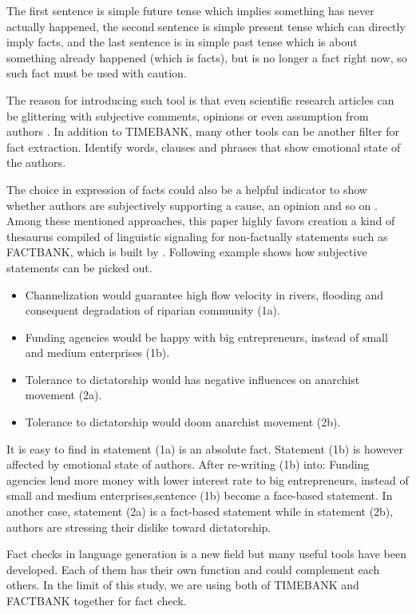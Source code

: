 The first sentence is simple future tense which implies something has never actually happened, the second sentence is simple present tense which can directly imply facts, and the last sentence is in simple past tense which is about something already happened (which is facts), but is no longer a fact right now, so such fact must be used with caution. 

The reason for introducing such tool is that even scientific research articles can be glittering with subjective comments, opinions or even assumption from authors \cite{schultze2000confessional}. In addition to TIMEBANK, many other tools can be another filter for fact extraction. \cite{Dave2003mining} Identify words, clauses and phrases that show emotional state of the authors. 

The choice in expression of facts could also be a helpful indicator to show whether authors are subjectively supporting a cause, an opinion and so on \cite{Wiebe2005}. Among these mentioned approaches, this paper highly favors creation a kind of thesaurus compiled of linguistic signaling for non-factually statements such as FACTBANK, which is built by \cite{Sauri2009}. 
Following example shows how subjective statements can be picked out.

\begin{itemize}
	\item Channelization would guarantee high flow velocity in rivers, flooding and consequent degradation of riparian community (1a).
	\item Funding agencies would be happy with big entrepreneurs, instead of small and medium enterprises (1b).
	\item Tolerance to dictatorship would has negative influences on anarchist movement (2a).
	\item Tolerance to dictatorship would doom anarchist movement (2b).
\end{itemize}

It is easy to find in statement (1a) is an absolute fact. 
Statement (1b) is however affected by emotional state of authors. 
After re-writing (1b) into: Funding agencies lend more money with lower interest rate to big entrepreneurs, instead of small 
and medium enterprises,sentence (1b) become a face-based statement. 
In another case, statement (2a) is a fact-based statement while in statement (2b), authors are stressing their dislike toward dictatorship.

Fact checks in language generation is a new field but many useful tools have been developed. Each of them has their own function and could complement each others. In the limit of this study, we are using both of TIMEBANK and FACTBANK together for fact check.


